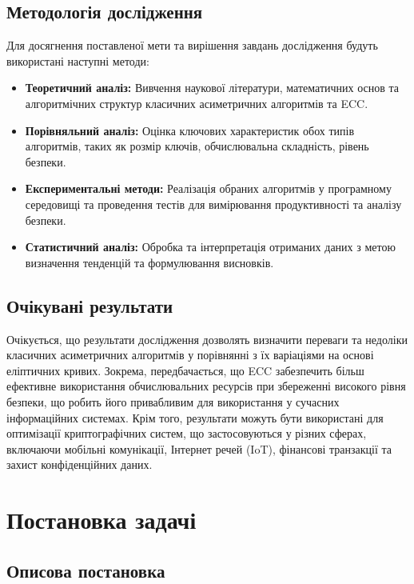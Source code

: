 \documentclass[12pt]{report}
\begin{document}
\section{Методологія дослідження}

Для досягнення поставленої мети та вирішення завдань дослідження будуть використані наступні методи:

\begin{itemize}
    \item \textbf{Теоретичний аналіз:} Вивчення наукової літератури, математичних основ та алгоритмічних структур класичних асиметричних алгоритмів та ECC.
    \item \textbf{Порівняльний аналіз:} Оцінка ключових характеристик обох типів алгоритмів, таких як розмір ключів, обчислювальна складність, рівень безпеки.
    \item \textbf{Експериментальні методи:} Реалізація обраних алгоритмів у програмному середовищі та проведення тестів для вимірювання продуктивності та аналізу безпеки.
    \item \textbf{Статистичний аналіз:} Обробка та інтерпретація отриманих даних з метою визначення тенденцій та формулювання висновків.
\end{itemize}

\section{Очікувані результати}

Очікується, що результати дослідження дозволять визначити переваги та недоліки класичних асиметричних алгоритмів у порівнянні з їх варіаціями на основі еліптичних кривих. Зокрема, передбачається, що ECC забезпечить більш ефективне використання обчислювальних ресурсів при збереженні високого рівня безпеки, що робить його привабливим для використання у сучасних інформаційних системах. Крім того, результати можуть бути використані для оптимізації криптографічних систем, що застосовуються у різних сферах, включаючи мобільні комунікації, Інтернет речей (IoT), фінансові транзакції та захист конфіденційних даних.


\chapter{Постановка задачі}

\section{Описова постановка}
\end{document}
